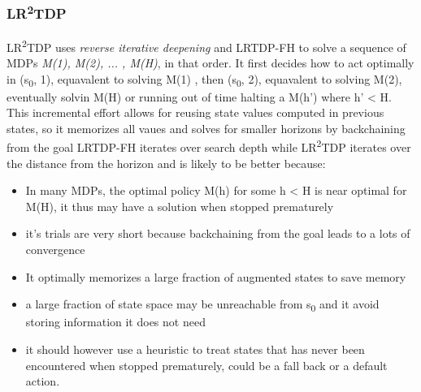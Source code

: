 \documentclass[runningheads,a4paper]{llncs}
\begin{document}
\subsubsection{LR\textsuperscript{2}TDP}
LR\textsuperscript{2}TDP uses \emph{reverse iterative deepening} and LRTDP-FH to solve a sequence of MDPs \emph{M(1), M(2), ... , M(H)}, in that order. It first decides how to act optimally in (s\textsubscript{0}, 1), equavalent to solving M(1) , then (s\textsubscript{0}, 2), equavalent to solving M(2), eventually solvin M(H) or running out of time halting a M(h') where h' < H. This incremental effort allows for reusing state values computed in previous states, so it memorizes all vaues and solves for smaller horizons by backchaining from the goal LRTDP-FH iterates over search depth while LR\textsuperscript{2}TDP iterates over the distance from the horizon and is likely to be better because:
 \begin{itemize}
	\item In many MDPs, the optimal policy M(h) for some h < H is near optimal for M(H), it thus may have a solution when stopped prematurely
	\item it's trials are very short because backchaining from the goal leads to a lots of convergence
	\item It optimally memorizes a large fraction of augmented states to save memory
	\item a large fraction of state space may be unreachable from s\textsubscript{0} and it avoid storing information it does not need

	\item it should however use a heuristic to treat states that has never been encountered when stopped prematurely, could be a fall back or a default action.  
\end{itemize}
\end{document}
